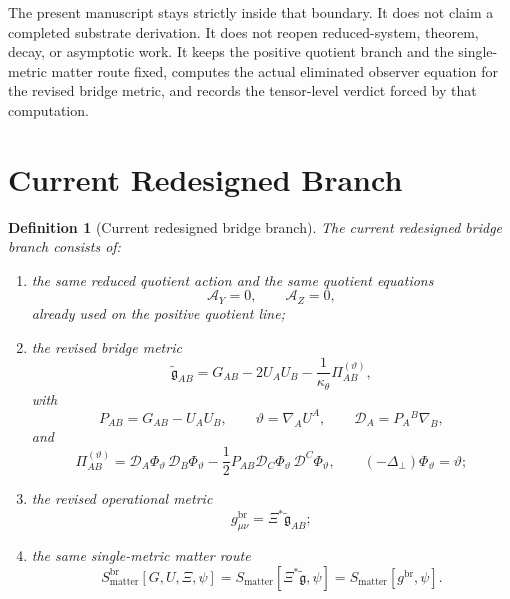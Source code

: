 \documentclass[11pt]{article}
\newcommand{\ReBridge}{\widetilde{\mathfrak{g}}}
\newcommand{\Proj}{\mathcal D}
\newcommand{\PiTheta}{\Pi^{(\vartheta)}}
\newcommand{\AY}{\mathcal A_Y}
\newcommand{\AZ}{\mathcal A_Z}
\newtheorem{definition}{Definition}
\begin{document}
The present manuscript stays strictly inside that boundary. It does not claim a completed substrate derivation. It does not reopen reduced-system, theorem, decay, or asymptotic work. It keeps the positive quotient branch and the single-metric matter route fixed, computes the actual eliminated observer equation for the revised bridge metric, and records the tensor-level verdict forced by that computation.

\section{Current Redesigned Branch}

\begin{definition}[Current redesigned bridge branch]
\label{def:branch}
The \emph{current redesigned bridge branch} consists of:
\begin{enumerate}
    \item the same reduced quotient action and the same quotient equations
    \begin{equation}
    \AY=0,
    \qquad
    \AZ=0,
    \label{eq:AYAZ}
    \end{equation}
    already used on the positive quotient line;
    \item the revised bridge metric
    \begin{equation}
    \ReBridge_{AB}
    =
    G_{AB}-2U_AU_B-\frac{1}{\kappa_\theta}\PiTheta_{AB},
    \label{eq:newbridge}
    \end{equation}
    with
    \begin{equation}
    P_{AB}=G_{AB}-U_AU_B,
    \qquad
    \vartheta=\nabla_AU^A,
    \qquad
    \Proj_A=P_A{}^B\nabla_B,
    \label{eq:proj}
    \end{equation}
    and
    \begin{equation}
    \PiTheta_{AB}
    =
    \Proj_A\Phi_\vartheta\,\Proj_B\Phi_\vartheta
    -\frac12 P_{AB}\Proj_C\Phi_\vartheta\,\Proj^C\Phi_\vartheta,
    \qquad
    (-\Delta_\perp)\Phi_\vartheta=\vartheta;
    \label{eq:pitheta}
    \end{equation}
    \item the revised operational metric
    \begin{equation}
    g^{\mathrm{br}}_{\mu\nu}=\Xi^\ast\ReBridge_{AB};
    \label{eq:gbr}
    \end{equation}
    \item the same single-metric matter route
    \begin{equation}
    S_{\mathrm{matter}}^{\mathrm{br}}[G,U,\Xi,\psi]
    =
    S_{\mathrm{matter}}[\Xi^\ast\ReBridge,\psi]
    =
    S_{\mathrm{matter}}[g^{\mathrm{br}},\psi].
    \label{eq:matter}
    \end{equation}
\end{enumerate}
\end{definition}
\end{document}
